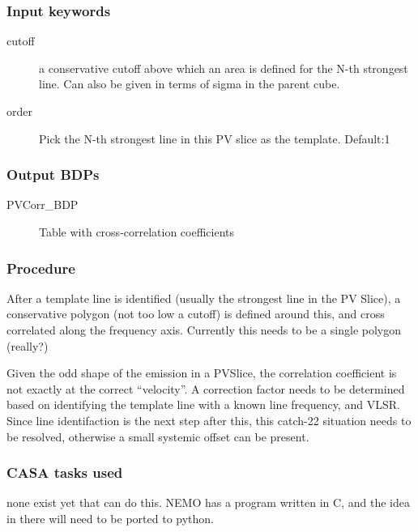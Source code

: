 \subsubsection{Input keywords}

\begin{description}

\item[cutoff] a conservative cutoff above which an area is defined for the N-th strongest line.
Can also be given in terms of sigma in the parent cube.

\item[order]  Pick the N-th strongest line in this PV slice as the template.
Default:1 

\end{description}

\subsubsection{Output BDPs}

\begin{description}

\item[PVCorr\_BDP] Table with cross-correlation coefficients

\end{description}


\subsubsection{Procedure}

After a template line is identified  (usually the strongest line in the PV Slice), a conservative 
polygon (not too low a cutoff) 
is defined around this, and cross correlated along the frequency axis. Currently this 
needs to be a single polygon (really?)

Given the odd shape of the emission in a PVSlice, the correlation coefficient is not
exactly at the correct ``velocity''.  A correction factor needs to be determined
based on identifying the template line with a known line frequency, and VLSR. Since
line identifaction is the next step after this, this catch-22 situation needs to
be resolved, otherwise a small systemic offset can be present.



\subsubsection{CASA tasks used}

none exist yet that can do this. NEMO has a program written in C, and the idea in there will
need to be ported to python.


\clearpage
